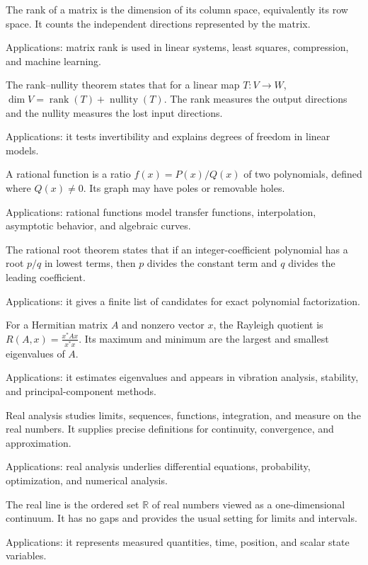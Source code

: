 The rank of a matrix is the dimension of its column space, equivalently its row space. It counts the independent directions represented by the matrix. \par\noindent Applications: matrix rank is used in linear systems, least squares, compression, and machine learning.

The rank--nullity theorem states that for a linear map $T:V\to W$, $\dim V=\operatorname{rank}(T)+\operatorname{nullity}(T)$. The rank measures the output directions and the nullity measures the lost input directions. \par\noindent Applications: it tests invertibility and explains degrees of freedom in linear models.

A rational function is a ratio $f(x)=P(x)/Q(x)$ of two polynomials, defined where $Q(x)\ne0$. Its graph may have poles or removable holes. \par\noindent Applications: rational functions model transfer functions, interpolation, asymptotic behavior, and algebraic curves.

The rational root theorem states that if an integer-coefficient polynomial has a root $p/q$ in lowest terms, then $p$ divides the constant term and $q$ divides the leading coefficient. \par\noindent Applications: it gives a finite list of candidates for exact polynomial factorization.

For a Hermitian matrix $A$ and nonzero vector $x$, the Rayleigh quotient is $R(A,x)=\frac{x^*Ax}{x^*x}$. Its maximum and minimum are the largest and smallest eigenvalues of $A$. \par\noindent Applications: it estimates eigenvalues and appears in vibration analysis, stability, and principal-component methods.

Real analysis studies limits, sequences, functions, integration, and measure on the real numbers. It supplies precise definitions for continuity, convergence, and approximation. \par\noindent Applications: real analysis underlies differential equations, probability, optimization, and numerical analysis.

The real line is the ordered set $\mathbb R$ of real numbers viewed as a one-dimensional continuum. It has no gaps and provides the usual setting for limits and intervals. \par\noindent Applications: it represents measured quantities, time, position, and scalar state variables.

